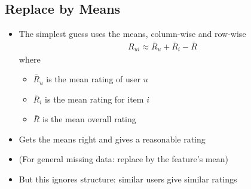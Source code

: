 \begin{slide}
\section[-1]{Replace by Means}

\begin{PauseHighLight}
  \begin{itemize}\squeeze
  \item The simplest guess uses the means, column-wise and row-wise
    \begin{align*}
      R_{ui} \approx \bar{R}_u + \bar{R}_i - \bar{R}
    \end{align*}
    where
    \begin{itemize}
    \item $\bar{R}_u$ is the mean rating of user $u$
    \item $\bar{R}_i$ is the mean rating for item $i$
    \item $\bar{R}$ is the mean overall rating\pause
    \end{itemize}
  \item Gets the means right and gives a reasonable rating\pause
  \item (For general missing data: replace by the feature's mean)\pause
  \item But this ignores structure: similar users give similar
    ratings\pause
  \end{itemize}
\end{PauseHighLight}

\end{slide}


